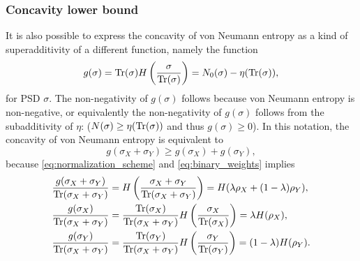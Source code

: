 \documentclass[notitlepage, 10pt]{article}
\begin{document}
\subsubsection{Concavity lower bound}
It is also possible to express the concavity of von Neumann entropy as a kind of superadditivity of a different function, namely the function 
\begin{equation}
    g(\sigma) = \operatorname{Tr}(\sigma) H\left(\frac{\sigma}{\operatorname{Tr}(\sigma)}\right) = N_0(\sigma) - \eta(\operatorname{Tr}(\sigma)),
\end{equation}
for PSD $\sigma$.
The non-negativity of $g(\sigma)$ follows because von Neumann entropy is non-negative, or equivalently the non-negativity of $g(\sigma)$ follows from the subadditivity of $\eta$: ($N(\sigma) \geq \eta(\operatorname{Tr}(\sigma))$ and thus $g(\sigma) \geq 0$).
In this notation, the concavity of von Neumann entropy is equivalent to
\begin{equation}
    g(\sigma_X + \sigma_Y) \geq g(\sigma_X) + g(\sigma_Y),
\end{equation}
because \cref{eq:normalization_scheme} and \cref{eq:binary_weights} implies
\begin{align}
    \frac{g(\sigma_X + \sigma_Y)}{\operatorname{Tr}(\sigma_X + \sigma_Y)} &= H\left(\frac{\sigma_X + \sigma_Y}{\operatorname{Tr}(\sigma_X + \sigma_Y)}\right) = H(\lambda \rho_X + (1-\lambda)\rho_Y), \\
    \frac{g(\sigma_X)}{\operatorname{Tr}(\sigma_X+\sigma_Y)} &= \frac{\operatorname{Tr}(\sigma_X)}{\operatorname{Tr}(\sigma_X+\sigma_Y)}H\left(\frac{\sigma_X}{\operatorname{Tr}(\sigma_X)}\right) = \lambda H(\rho_X), \\
    \frac{g(\sigma_Y)}{\operatorname{Tr}(\sigma_X+\sigma_Y)} &= \frac{\operatorname{Tr}(\sigma_Y)}{\operatorname{Tr}(\sigma_X+\sigma_Y)}H\left(\frac{\sigma_Y}{\operatorname{Tr}(\sigma_Y)}\right) = (1-\lambda) H(\rho_Y).
\end{align}
\end{document}
